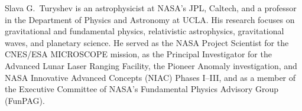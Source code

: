 \documentclass[a4paper,parskip,10pt]{scrartcl}
\begin{document}
\begin{tcolorbox}
        {
            \small
            \color{white!20!black}
            Slava G.\ Turyshev is an astrophysicist at NASA's JPL, Caltech, and a professor in the Department of Physics and Astronomy at UCLA. His research focuses on gravitational and fundamental physics, relativistic astrophysics, gravitational waves, and planetary science. He served as the NASA Project Scientist for the CNES/ESA MICROSCOPE mission, as the Principal Investigator for the Advanced Lunar Laser Ranging Facility, the Pioneer Anomaly investigation, and NASA Innovative Advanced Concepts (NIAC) Phases I–III, and as a member of the Executive Committee of NASA’s Fundamental Physics Advisory Group (FunPAG).}

        

        \vspace{2ex}
    \end{tcolorbox}
    \vspace{-1ex}

    \vfill
\end{document}

